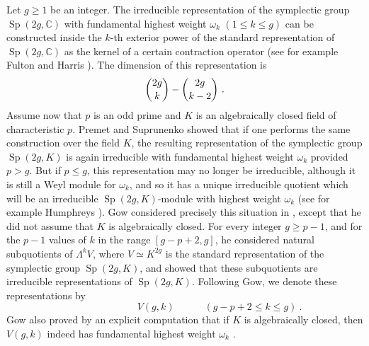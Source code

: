 \documentclass{amsart}
\begin{document}
Let $g\geq 1$ be an integer. The  irreducible representation of the
symplectic group $\operatorname{Sp}(2g,{\mathbb C})$ with fundamental highest weight $\omega_k$ $(1\leq
k\leq g)$ can be constructed inside the $k$-th exterior power of the
standard representation of $\operatorname{Sp}(2g,{\mathbb C})$ as the kernel of a certain contraction
operator (see for example Fulton and Harris \cite[\S17]{FH}). The
dimension of this representation is
\begin{equation}{\label{{funk}}{
	\if{n} y
		\smash{\makebox[0pt]{\hspace{-0.5in}
			\raisebox{8pt}{\tt\tiny {{funk}}}}}
	\fi
}}
\binom{2g}{k} - \binom{2g}{k-2}~.
\end{equation}
 Assume now that $p$ is an odd
prime and $K$ is an algebraically closed field of characteristic $p$.  Premet and Suprunenko \cite{PS} showed that if one performs the same
construction over the field $K$, 
the resulting representation of the symplectic group $\operatorname{Sp}(2g,K)$ is
again irreducible with fundamental highest weight $\omega_k$ provided
$p>g$. But if $p\leq g$, this representation may no longer be
irreducible, although it is still a Weyl module for  $\omega_k$, and
so 
it has a unique irreducible quotient which will be an
irreducible $\operatorname{Sp}(2g,K)$-module with highest weight $\omega_k$ (see for example Humphreys
\cite[\S3.1]{H}).  
Gow
considered precisely this situation in \cite{Go}, except that he did
not assume that $K$ is algebraically closed. For  every integer $g\geq
p-1$,  and for the $p-1$ values of $k$ in the range $[g-p+2,g]$,  he
considered natural subquotients of $\Lambda^kV$, where $V\simeq K^{2g}$
is the standard representation of the symplectic group  
$\operatorname{Sp}(2g,K)$, and showed that these subquotients
are irreducible representations of   
$\operatorname{Sp}(2g,K)$. Following Gow, we denote these representations by 
\begin{equation*}\qquad \qquad \qquad \quad V(g,k) \qquad \quad (g-p+2 \leq k \leq g)~.
\end{equation*} Gow also proved by an explicit computation that if $K$
is algebraically closed, then $V(g,k)$ indeed has
fundamental highest weight $\omega_k$ \cite[Corollary~2.4]{Go}.
\end{document}
